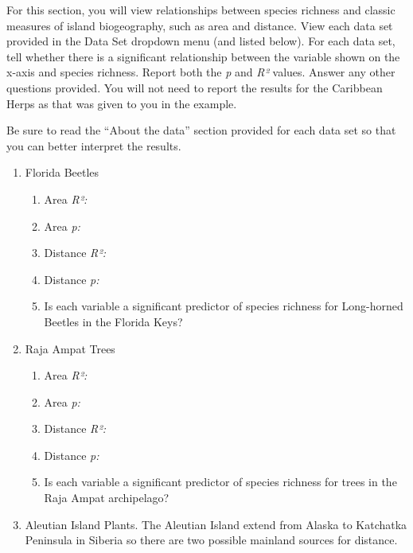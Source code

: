 \documentclass[11pt, addpoints]{exam}
\begin{document}
\begin{questions}

\question[10]
For this section, you will view relationships between species richness and classic measures of island biogeography, such as area and distance. View each data set provided in the Data Set dropdown menu (and listed below). For each data set, tell whether there is a significant relationship between the variable shown on the x-axis and species richness. Report both the \textit{p} and \textit{R²} values. Answer any other questions provided. You will not need to report the results for the Caribbean Herps as that was given to you in the example.

Be sure to read the “About the data” section provided for each data set so that you can better interpret the results. 

\begin{enumerate}
	\item Florida Beetles

	\begin{enumerate}
		\item  Area \textit{R²:} 
	
		\item Area \textit{p:}
		\item  Distance \textit{R²:} 
		
		\item Distance \textit{p:}
		
		\item Is each variable a significant predictor of species richness for Long-horned Beetles in the Florida Keys?
	\end{enumerate}
	
	\item Raja Ampat Trees

	\begin{enumerate}
		\item  Area \textit{R²:} 
	
		\item Area \textit{p:}

		\item  Distance \textit{R²:} 
	
		\item Distance \textit{p:}
	
		\item Is each variable a significant predictor of species richness for trees in the Raja Ampat archipelago?
	\end{enumerate}

	\item Aleutian Island Plants. The Aleutian Island extend from Alaska to Katchatka Peninsula in Siberia so there are two possible mainland sources for distance.


\end{enumerate}
\end{questions}
\end{document}
